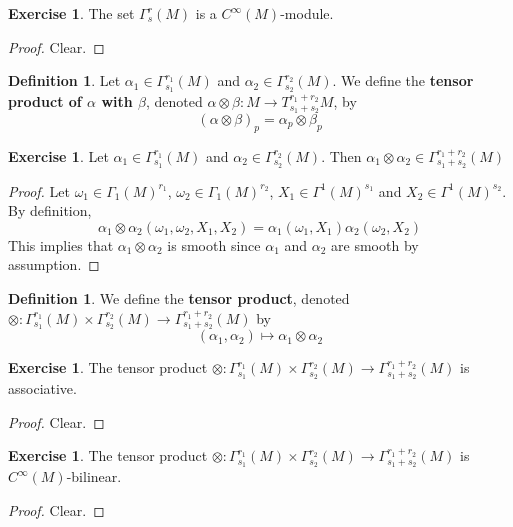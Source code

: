 \documentclass[12pt]{amsart}
\theoremstyle{definition}
\newtheorem{defn}[definition]{Definition}
\newtheorem{ex}[definition]{Exercise}
\newcommand{\al}{\alpha}
\newcommand{\Gam}{\Gamma}
\newcommand{\bet}{\beta}
\newcommand{\om}{\omega}
\begin{document}
	\begin{ex}
	The set $\Gam^r_s(M)$ is a $C^{\infty}(M)$-module.
	\end{ex}
	
	\begin{proof}
	Clear.
	\end{proof}
	
	\begin{defn}
	Let $\al_1 \in \Gam^{r_1}_{s_1}(M)$ and $\al_2 \in \Gam^{r_2}_{s_2}(M)$. We define the \textbf{tensor product of $\al$ with $\bet$}, denoted $\al \otimes \bet : M \rightarrow T^{r_1 + r_2}_{s_1 + s_2}M$, by $$(\al \otimes \bet)_p = \al_p \otimes \bet_p$$
	\end{defn}
	
	\begin{ex}
	Let $\al_1 \in \Gam^{r_1}_{s_1}(M)$ and $\al_2 \in \Gam^{r_2}_{s_2}(M)$. Then $\al_1 \otimes \al_2 \in \Gam^{r_1 + r_2}_{s_1 + s_2}(M)$
	\end{ex}
	
	\begin{proof}
	Let $\om_1 \in \Gam_1(M)^{r_1}$, $\om_2 \in \Gam_1(M)^{r_2}$, $X_1 \in \Gam^1(M)^{s_1}$ and $X_2 \in \Gam^1(M)^{s_2}$. By definition,
	$$\al_1 \otimes \al_2 (\om_1, \om_2, X_1, X_2) = \al_1(\om_1, X_1) \al_2(\om_2, X_2)$$
	This implies that $\al_1 \otimes \al_2$ is smooth since $\al_1$ and $\al_2$ are smooth by assumption.
	\end{proof}
	
	\begin{defn}
	We define the \textbf{tensor product}, denoted $\otimes : \Gam^{r_1}_{s_1}(M) \times \Gam^{r_2}_{s_2}(M) \rightarrow \Gam^{r_1+r_2}_{s_1+s_2}(M)$ by $$(\al_1, \al_2) \mapsto \al_1 \otimes \al_2 $$
	\end{defn}	
	
	\begin{ex}
	The tensor product $\otimes : \Gam^{r_1}_{s_1}(M) \times \Gam^{r_2}_{s_2}(M) \rightarrow \Gam^{r_1+r_2}_{s_1+s_2}(M)$ is associative.
	\end{ex}
	
	\begin{proof}
	Clear.
	\end{proof}
	
	\begin{ex}
	The tensor product $\otimes : \Gam^{r_1}_{s_1}(M) \times \Gam^{r_2}_{s_2}(M) \rightarrow \Gam^{r_1+r_2}_{s_1+s_2}(M)$ is $C^{\infty}(M)$-bilinear.
	\end{ex}
	
	\begin{proof}
	Clear.
	\end{proof}
	
\end{document}
